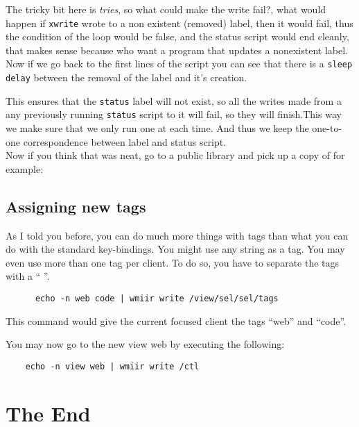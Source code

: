 \documentclass[12pt,a4paper]{article} %
\begin{document}
    The tricky bit here is \emph{tries}, so what could make the write
    fail?, what would happen if \verb+xwrite+ wrote to a non existent
    (removed) label, then it would fail, thus the condition of the
    loop would be false, and the status script would end cleanly, that
    makes sense because who want a program that updates a nonexistent
    label.\\

    Now if we go back to the first lines of the script you can see
    that there is a \verb+sleep delay+ between the removal of the
    label and it's creation.
  
    This ensures that the \verb+status+ label will not exist, so all
    the writes made from a any previously running \verb+status+ script
    to it will fail, so they will finish.This way we make sure that we
    only run one at each time.  And thus we keep the one-to-one
    correspondence between label and status script.\\
  
    Now if you think that was neat, go to a public library and pick up
    a copy of for example: 

  
  \subsection{Assigning new tags}
  
    As I told you before, you can do much more things with tags than
    what you can do with the standard key-bindings. You might use any
    string as a tag. You may even use more than one tag per client. To
    do so, you have to separate the tags with a `` ''.

    \begin{verbatim}
      echo -n web code | wmiir write /view/sel/sel/tags
  \end{verbatim}

  This command would give the current focused client the tags
  ``web'' and ``code''.

  You may now go to the new view web by executing the following:

  \begin{verbatim}
    echo -n view web | wmiir write /ctl
  \end{verbatim}


  \section{The End}
    
\end{document}
